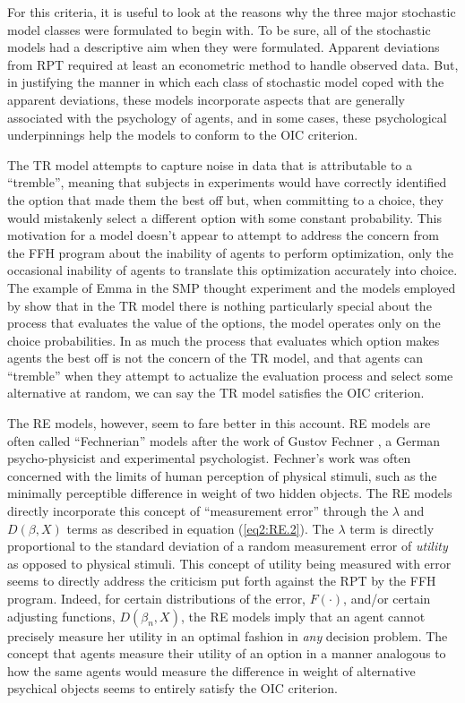 \documentclass[../main.tex]{subfiles}
\begin{document}
For this criteria, it is useful to look at the reasons why the three major stochastic model classes were formulated to begin with.
To be sure, all of the stochastic models had a descriptive aim when they were formulated.
Apparent deviations from RPT required at least an econometric method to handle observed data.
But, in justifying the manner in which each class of stochastic model coped with the apparent deviations, these models incorporate aspects that are generally associated with the psychology of agents, and in some cases, these psychological underpinnings help the models to conform to the OIC criterion.

The TR model attempts to capture noise in data that is attributable to a \enquote{tremble}, meaning that subjects in experiments would have correctly identified the option that made them the best off but, when committing to a choice, they would mistakenly select a different option with some constant probability.
This motivation for a model doesn't appear to attempt to address the concern from the FFH program about the inability of agents to perform optimization, only the occasional inability of agents to translate this optimization accurately into choice.
The example of Emma in the SMP thought experiment and the models employed by \textcite{Loomes2002} show that in the TR model there is nothing particularly special about the process that evaluates the value of the options, the model operates only on the choice probabilities.
In as much the process that evaluates which option makes agents the best off is not the concern of the TR model, and that agents can \enquote{tremble} when they attempt to actualize the evaluation process and select some alternative at random, we can say the TR model satisfies the OIC criterion.

The RE models, however, seem to fare better in this account.
RE models are often called \enquote{Fechnerian} models after the work of Gustov Fechner \parencite{Fechner1966a}, a German psycho-physicist and experimental psychologist.
Fechner's work was often concerned with the limits of human perception of physical stimuli, such as the minimally perceptible difference in weight of two hidden objects.
The RE models directly incorporate this concept of \enquote{measurement error} through the $\lambda$ and $D(\beta,X)$ terms as described in equation (\ref{eq2:RE.2}).
The $\lambda$ term is directly proportional to the standard deviation of a random measurement error of \textit{utility} as opposed to physical stimuli.
This concept of utility being measured with error seems to directly address the criticism put forth against the RPT by the FFH program.
Indeed, for certain distributions of the error, $F(\cdot)$, and/or certain adjusting functions, $D(\beta_n,X)$, the RE models imply that an agent cannot precisely measure her utility in an optimal fashion in \textit{any} decision problem.
The concept that agents measure their utility of an option in a manner analogous to how the same agents would measure the difference in weight of alternative psychical objects seems to entirely satisfy the OIC criterion.
\end{document}
